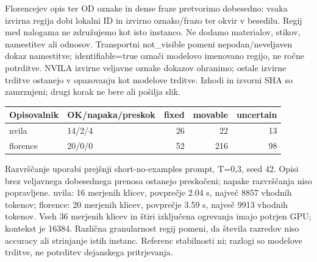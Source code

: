 \documentclass[10pt,a4paper]{article}
\begin{document}
Florencejev opis ter OD oznake in dense fraze pretvorimo dobesedno: vsaka izvirna regija dobi lokalni ID in izvirno oznako/frazo ter okvir v besedilu. Regij med nalogama ne združujemo kot isto instanco. Ne dodamo materialov, stikov, namestitev ali odnosov. Transportni not\_visible pomeni nepodan/neveljaven dokaz namestitve; identifiable=true označi modelovo imenovano regijo, ne ročne potrditve. NVILA izvirne veljavne oznake dokazov ohranimo; ostale izvirne trditve ostanejo v opazovanju kot modelove trditve. Izhodi in izvorni SHA so zamrznjeni; drugi korak ne bere ali pošilja slik.
\begin{center}\small\begin{tabular}{p{3cm}p{4cm}rrr}\toprule
Opisovalnik & OK/napaka/preskok & fixed & movable & uncertain \\ \midrule
nvila & 14/2/4 & 26 & 22 & 13 \\
florence & 20/0/0 & 52 & 216 & 98 \\
\bottomrule\end{tabular}\end{center}

Razvrščanje uporabi prejšnji short-no-examples prompt, T=0,3, seed 42. Opisi brez veljavnega dobesednega prenosa ostanejo preskočeni; napake razvrščanja niso popravljene. nvila: 16 merjenih klicev, povprečje 2.04 s, največ 8857 vhodnih tokenov; florence: 20 merjenih klicev, povprečje 3.59 s, največ 9913 vhodnih tokenov. Vseh 36 merjenih klicev in štiri izključena ogrevanja imajo potrjen GPU; kontekst je 16384. Različna granularnost regij pomeni, da števila razredov niso accuracy ali strinjanje istih instanc. Referenc stabilnosti ni; razlogi so modelove trditve, ne potrditev dejanskega pritrjevanja.

\newpage
\end{document}
